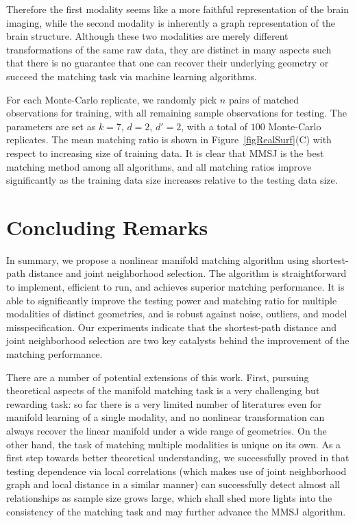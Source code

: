\documentclass[times,twocolumn,final]{elsarticle}
\begin{document}
Therefore the first modality seems like a more faithful representation of the brain imaging, while the second modality is inherently a graph representation of the brain structure. Although these two modalities are merely different transformations of the same raw data, they are distinct in many aspects such that there is no guarantee that one can recover their underlying geometry or succeed the matching task via machine learning algorithms.

For each Monte-Carlo replicate, we randomly pick $n$ pairs of matched observations for training, with all remaining sample observations for testing. The parameters are set as $k=7$, $d=2$, $d'=2$, with a total of $100$ Monte-Carlo replicates. The mean matching ratio is shown in Figure~\ref{figRealSurf}(C) with respect to increasing size of training data. It is clear that MMSJ is the best matching method among all algorithms, and all matching ratios improve significantly as the training data size increases relative to the testing data size.

\section{Concluding Remarks}
\label{conclu}
In summary, we propose a nonlinear manifold matching algorithm using shortest-path distance and joint neighborhood selection. The algorithm is straightforward to implement, efficient to run, and achieves superior matching performance. It is able to significantly improve the testing power and matching ratio for multiple modalities of distinct geometries, and is robust against noise, outliers, and model misspecification. Our experiments indicate that the shortest-path distance and joint neighborhood selection are two key catalysts behind the improvement of the matching performance.

There are a number of potential extensions of this work. First, pursuing theoretical aspects of the manifold matching task is a very challenging but rewarding task: so far there is a very limited number of literatures even for manifold learning of a single modality, and no nonlinear transformation can always recover the linear manifold under a wide range of geometries. On the other hand, the task of matching multiple modalities is unique on its own. As a first step towards better theoretical understanding, we successfully proved in \cite{ShenEtAl2017} that testing dependence via local correlations (which makes use of joint neighborhood graph and local distance in a similar manner) can successfully detect almost all relationships as sample size grows large, which shall shed more lights into the consistency of the matching task and may further advance the MMSJ algorithm.
\end{document}
